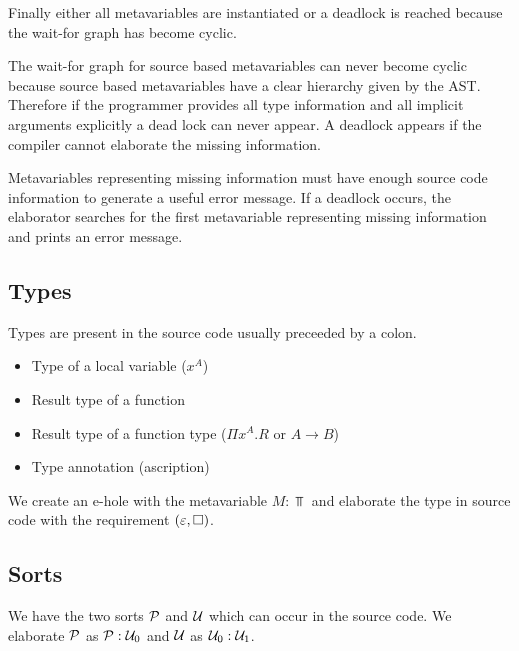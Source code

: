 Finally either all metavariables are instantiated or a deadlock is reached
because the wait-for graph has become cyclic.

The wait-for graph for source based metavariables can never become cyclic
because source based metavariables have a clear hierarchy given by the AST.
Therefore if the programmer provides all type information and all implicit
arguments explicitly a dead lock can never
appear. A deadlock appears if the compiler cannot elaborate the missing
information.

Metavariables representing missing information must have enough source code
information to generate a useful error message. If a deadlock occurs, the
elaborator searches for the first metavariable representing missing
information and prints an error message.






\subsection{Types}

Types are present in the source code usually preceeded by a colon.
\begin{itemize}
    \item Type of a local variable ($x^A$)

    \item Result type of a function

    \item Result type of a function type ($\Pi x^A.R$ or $A \to B$)

    \item Type annotation (ascription)
\end{itemize}

We create an e-hole with the metavariable $M: \Top$ and elaborate the type in
source code with the requirement $(\varepsilon, {\Box})$.






\subsection{Sorts}

We have the two sorts ${\mathcal P}$ and ${\mathcal U}$ which can occur in the source code. We
elaborate ${\mathcal P}$ as ${\mathcal P} : {\mathcal U}_0$ and ${\mathcal U}$ as ${\mathcal U}_0 : {\mathcal U}_1$.

